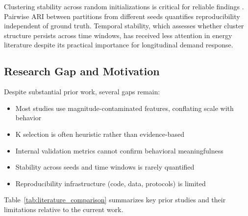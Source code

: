 \documentclass[11pt,a4paper]{article}
\begin{document}
Clustering stability across random initializations is critical for reliable findings \cite{henning2020adjusting}. Pairwise ARI between partitions from different seeds quantifies reproducibility independent of ground truth. Temporal stability, which assesses whether cluster structure persists across time windows, has received less attention in energy literature despite its practical importance for longitudinal demand response.

\subsection{Research Gap and Motivation}

Despite substantial prior work, several gaps remain:

\begin{itemize}
    \item Most studies use magnitude-contaminated features, conflating scale with behavior
    \item K selection is often heuristic rather than evidence-based
    \item Internal validation metrics cannot confirm behavioral meaningfulness
    \item Stability across seeds and time windows is rarely quantified
    \item Reproducibility infrastructure (code, data, protocols) is limited
\end{itemize}

Table~\ref{tab:literature_comparison} summarizes key prior studies and their limitations relative to the current work.
\end{document}
